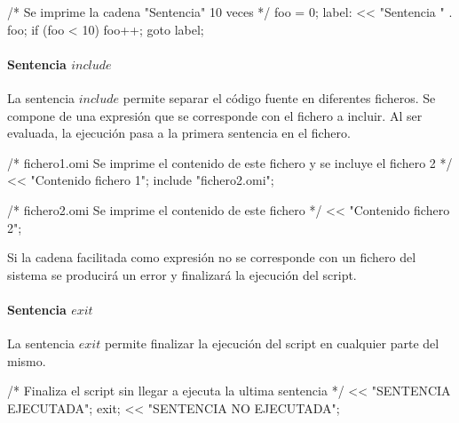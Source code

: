 \begin{myverbatim}
   /*
      Se imprime la cadena
      "Sentencia" 10 veces
   */
   foo = 0;
   label: << "Sentencia " . foo;
   if (foo < 10){
      foo++;
      goto label;
   }
\end{myverbatim}


\paragraph{Sentencia $include$} \label{sec:stmt_include}
La sentencia $include$ permite separar el código fuente en diferentes ficheros. Se compone de una 
expresión que se corresponde con el fichero a incluir. Al ser evaluada,
la ejecución pasa a la primera sentencia en el fichero. \\

\begin{myverbatim}
   /*
      fichero1.omi
      Se imprime el contenido de este fichero
      y se incluye el fichero 2
   */
   << "Contenido fichero 1";
   include "fichero2.omi";
\end{myverbatim}

\begin{myverbatim}
   /*
      fichero2.omi
      Se imprime el contenido de este fichero
   */
   << "Contenido fichero 2";
\end{myverbatim}

Si la cadena facilitada como expresión no se corresponde con un fichero del sistema
se producirá un error y finalizará la ejecución del script.

\paragraph{Sentencia $exit$} \label{sec:stmt_exit}

La sentencia $exit$ permite finalizar la ejecución del script en cualquier parte del mismo. \\

\begin{myverbatim}
   /*
      Finaliza el script sin llegar 
      a ejecuta la ultima sentencia
   */
   << "SENTENCIA EJECUTADA";
   exit;
   << "SENTENCIA NO EJECUTADA";
\end{myverbatim}

